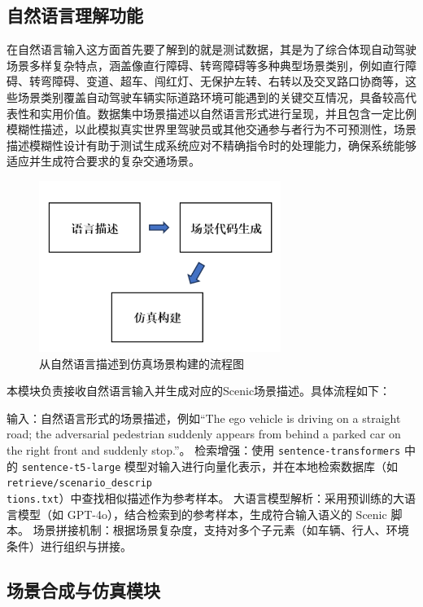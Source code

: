 \subsection{自然语言理解功能}
在自然语言输入这方面首先要了解到的就是测试数据，其是为了综合体现自动驾驶场景多样复杂特点，涵盖像直行障碍、转弯障碍等多种典型场景类别，例如直行障碍、转弯障碍、变道、超车、闯红灯、无保护左转、右转以及交叉路口协商等，这些场景类别覆盖自动驾驶车辆实际道路环境可能遇到的关键交互情况，具备较高代表性和实用价值。数据集中场景描述以自然语言形式进行呈现，并且包含一定比例模糊性描述，以此模拟真实世界里驾驶员或其他交通参与者行为不可预测性，场景描述模糊性设计有助于测试生成系统应对不精确指令时的处理能力，确保系统能够适应并生成符合要求的复杂交通场景。
\begin{figure}[H]
	\centering
	\includegraphics[width=0.7\textwidth]{"images/流程图1.pdf"}
	\caption{从自然语言描述到仿真场景构建的流程图}
	\label{fig:flowchart}
\end{figure}

本模块负责接收自然语言输入并生成对应的Scenic场景描述。具体流程如下：

输入：自然语言形式的场景描述，例如“The ego vehicle is driving on a straight road; the adversarial pedestrian suddenly appears from behind a parked car on the right front and suddenly stop.”。
检索增强：使用 \texttt{sentence-transformers} 中的 \texttt{sentence-t5-large} 模型对输入进行向量化表示，并在本地检索数据库（如 \texttt{retrieve/scenario\_descrip\\tions.txt}）中查找相似描述作为参考样本。
大语言模型解析：采用预训练的大语言模型（如 GPT-4o），结合检索到的参考样本，生成符合输入语义的 Scenic 脚本。
场景拼接机制：根据场景复杂度，支持对多个子元素（如车辆、行人、环境条件）进行组织与拼接。



\subsection{场景合成与仿真模块}

